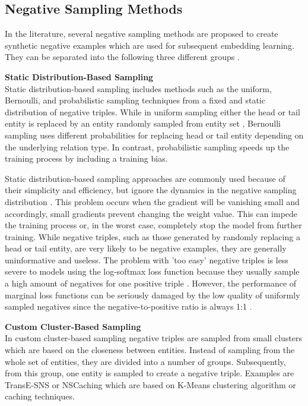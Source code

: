 \subsection{Negative Sampling Methods} 
\label{subsec:negative_sampling_methods}
%
In the literature, several negative sampling methods are proposed to create synthetic negative examples which are used for subsequent embedding learning.
They can be separated into the following three different groups \cite{qianunderstanding}.

\textbf{Static Distribution-Based Sampling} \label{static_distribution_based_sampling}\\
Static distribution-based sampling includes methods such as the uniform, Bernoulli, and probabilistic sampling techniques from a fixed and static distribution of negative triples.
While in uniform sampling either the head or tail entity is replaced by an entity randomly sampled from entity set \entities,
Bernoulli sampling uses different probabilities for replacing head or tail entity depending on the underlying relation type.
In contrast, probabilistic sampling speeds up the training process by including a training bias.
	
Static distribution-based sampling approaches are commonly used because of their simplicity and efficiency, but ignore the dynamics in the negative sampling distribution \cite{qianunderstanding}.
This problem occurs when the gradient will be vanishing small and accordingly, small gradients prevent changing the weight value.
This can impede the training process or, in the worst case, completely stop the model from further training.
While negative triples, such as those generated by randomly replacing a head or tail entity, are very likely to be negative examples, they are generally uninformative and useless.
The problem with 'too easy' negative triples is less severe to models using the log-softmax loss function because they usually sample a high amount of negatives for one positive triple \cite{cai2017kbgan}.
However, the performance of marginal loss functions can be seriously damaged by the low quality of uniformly sampled negatives since the negative-to-positive ratio is always 1:1 \cite{cai2017kbgan}.


\textbf{Custom Cluster-Based Sampling} \label{subsubsec:custom_cluster_based_sampling}\\
In custom cluster-based sampling negative triples are sampled from small clusters which are based on the closeness between entities.
Instead of sampling from the whole set of entities, they are divided into a number of groups.
Subsequently, from this group, one entity is sampled to create a negative triple. 
Examples are TransE-\ac{SNS} \cite{TransE-SNS} or \ac{NSCaching} \cite{zhang2019nscaching} which are based on K-Means clustering algorithm or caching techniques. 

